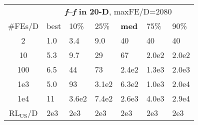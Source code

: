\begin{tabular}{c|llllll}
 & \multicolumn{6}{|c}{\textbf{\textit{f}\raisebox{-0.35ex}{1}--\textit{f}\raisebox{-0.35ex}{24} in 20-D}, maxFE/D=2080}\\
\#FEs/D & best & 10\% & 25\% & \textbf{med} & 75\% & 90\%\\
2 & \hspace*{1ex}1.0 & \hspace*{1ex}3.4 & \hspace*{1ex}9.0 & 40 & 40 & 40\\
10 & \hspace*{1ex}5.3 & \hspace*{1ex}9.7 & 29 & 67 & 2.0e2 & 2.0e2\\
100 & \hspace*{1ex}6.5 & 44 & 73 & 2.4e2 & 1.3e3 & 2.0e3\\
1e3 & \hspace*{1ex}5.0 & 93 & 3.1e2 & 6.3e2 & 1.0e3 & 2.0e4\\
1e4 & 11 & 3.6e2 & 7.4e2 & 2.6e3 & 4.0e3 & 2.9e4\\
$\text{RL}_{\text{US}}$/D & 2e3 & 2e3 & 2e3 & 2e3 & 2e3 & 2e3
\end{tabular}
